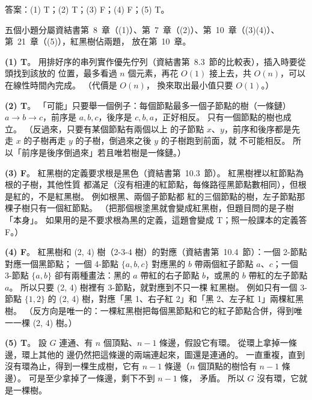 \begin{pastsoln}
答案：(1) T；(2) T；(3) F；(4) F；(5) T。

五個小題分屬資結書第~8~章（(1)）、第~7~章（(2)）、第~10~章（(3)(4)）、第~21~章（(5)），紅黑樹佔兩題，
放在第~10~章。

\textbf{(1) T}。 用排好序的串列實作優先佇列（資結書第~8.3~節的比較表），插入時要從頭找到該放的
位置，最多看過 $n$ 個元素，再花 $O(1)$ 接上去，共 $O(n)$，可以在線性時間內完成。 （代價是 $O(n)$，
換來取出最小值只要 $O(1)$。）

\textbf{(2) T}。 「可能」只要舉一個例子：每個節點最多一個子節點的樹（一條鏈）$a \to b \to c$，前序是
$a, b, c$，後序是 $c, b, a$，正好相反。 只有一個節點的樹也成立。 （反過來，只要有某個節點有兩個以上
的子節點 $x$、$y$，前序和後序都是先走 $x$ 的子樹再走 $y$ 的子樹，倒過來之後 $y$ 的子樹跑到前面，就
不可能相反。 所以「前序是後序倒過來」若且唯若樹是一條鏈。）

\textbf{(3) F}。 紅黑樹的定義要求根是黑色（資結書第~10.3~節）。 紅黑樹裡以紅節點為根的子樹，其他性質
都滿足（沒有相連的紅節點，每條路徑黑節點數相同），但根是紅的，不是紅黑樹。 例如根黑、兩個子節點都
紅的三個節點的樹，左子節點那棵子樹只有一個紅節點。 （把那個根塗黑就會變成紅黑樹，但題目問的是子樹
「本身」。 如果用的是不要求根為黑的定義，這題會變成 T；照一般課本的定義答 F。）

\textbf{(4) F}。 紅黑樹和 (2, 4) 樹（2-3-4 樹）的對應（資結書第~10.4~節）：一個 2-節點對應一個黑節點；
一個 4-節點 $\{a, b, c\}$ 對應黑的 $b$ 帶兩個紅子節點 $a$、$c$；一個 3-節點 $\{a, b\}$ 卻有兩種畫法：黑的
$a$ 帶紅的右子節點 $b$，或黑的 $b$ 帶紅的左子節點 $a$。 所以只要 (2, 4) 樹裡有 3-節點，就對應到不只一棵
紅黑樹。 例如只有一個 3-節點 $\{1, 2\}$ 的 (2, 4) 樹，對應「黑 1、右子紅 2」和「黑 2、左子紅 1」兩棵紅黑樹。
（反方向是唯一的：一棵紅黑樹把每個黑節點和它的紅子節點合併，得到唯一一棵 (2, 4) 樹。）

\textbf{(5) T}。 設 $G$ 連通、有 $n$ 個頂點、$n - 1$ 條邊，假設它有環。 從環上拿掉一條邊，環上其他的
邊仍然把這條邊的兩端連起來，圖還是連通的。 一直重複，直到沒有環為止，得到一棵生成樹，它有 $n - 1$
條邊（$n$ 個頂點的樹恰有 $n - 1$ 條邊）。 可是至少拿掉了一條邊，剩下不到 $n - 1$ 條，
矛盾。 所以 $G$ 沒有環，它就是一棵樹。
\end{pastsoln}
